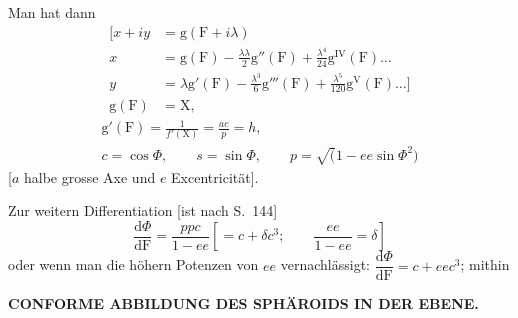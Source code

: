 Man hat dann
\[
\begin{aligned}
\mathopen{[}x+iy&=\mathrm g(\mathrm F+i\lambda)\\
x&=\mathrm g(\mathrm F)-\frac{\lambda\lambda}{2}\mathrm g''(\mathrm F)
 +\frac{\lambda^4}{24}\mathrm g^{\mathrm{IV}}(\mathrm F)\ldots\\
y&=\lambda\mathrm g'(\mathrm F)-\frac{\lambda^3}{6}\mathrm g'''(\mathrm F)
 +\frac{\lambda^5}{120}\mathrm g^{\mathrm V}(\mathrm F)\ldots]\\
\mathrm g(\mathrm F)&=\mathrm X,
\end{aligned}
\]
\noindent [wenn jetzt \(\mathrm X\) die Abscisse bezeichnet, die zum Durchschnitt des
Parallelkreises \(\Phi\) mit dem Hauptmeridian gehört; nach Art.\ 1 ist daher
\(f(\mathrm X)=\mathrm F(\Phi)\), also
\(\dfrac{\mathrm d\mathrm X}{\mathrm d\mathrm F}=\dfrac1{f'(\mathrm X)}\). Damit wird:]
\[
\begin{gathered}
\mathrm g'(\mathrm F)=\frac1{f'(\mathrm X)}=\frac{ac}{p}=h,\\
c=\cos\Phi,\qquad s=\sin\Phi,\qquad p=\surd(1-ee\sin\Phi^2)
\end{gathered}
\]
[\(a\) halbe grosse Axe und \(e\) Excentricität].

Zur weitern Differentiation [ist nach S.\ 144]
\[
\frac{\mathrm d\Phi}{\mathrm d\mathrm F}=\frac{ppc}{1-ee}
 \left[=c+\delta c^3;\qquad\frac{ee}{1-ee}=\delta\right]
\]
\noindent oder wenn man die höhern Potenzen von \(ee\) vernachlässigt:
\(\dfrac{\mathrm d\Phi}{\mathrm d\mathrm F}=c+eec^3\); mithin

\par\clearpage
\noindent\null\hfill{\small\textbf{CONFORME ABBILDUNG DES SPHÄROIDS IN DER EBENE.}}\hfill{}\par\medskip

